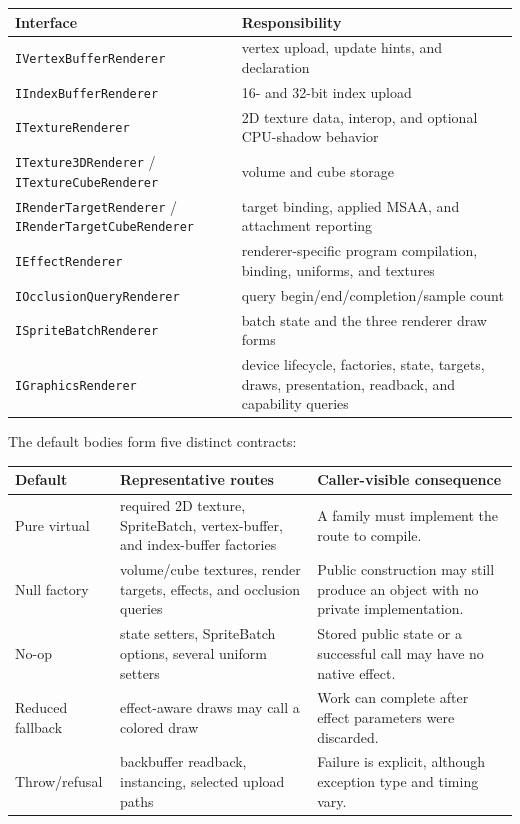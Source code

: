 \begin{center}
\small
\begin{tabular}{@{}p{}p{}@{}}
\toprule
\textbf{Interface} & \textbf{Responsibility} \\
\midrule
\texttt{IVertexBufferRenderer} & vertex upload, update hints, and declaration \\
\texttt{IIndexBufferRenderer} & 16- and 32-bit index upload \\
\texttt{ITextureRenderer} & 2D texture data, interop, and optional CPU-shadow behavior \\
\texttt{ITexture3DRenderer} / \texttt{ITextureCubeRenderer} & volume and cube storage \\
\texttt{IRenderTargetRenderer} / \texttt{IRenderTargetCubeRenderer} & target binding, applied MSAA, and attachment reporting \\
\texttt{IEffectRenderer} & renderer-specific program compilation, binding, uniforms, and textures \\
\texttt{IOcclusionQueryRenderer} & query begin/end/completion/sample count \\
\texttt{ISpriteBatchRenderer} & batch state and the three renderer draw forms \\
\texttt{IGraphicsRenderer} & device lifecycle, factories, state, targets, draws, presentation, readback, and capability queries \\
\bottomrule
\end{tabular}
\end{center}

The default bodies form five distinct contracts:

\begin{center}
\small
\begin{tabular}{@{}p{}p{}p{}@{}}
\toprule
\textbf{Default} & \textbf{Representative routes} & \textbf{Caller-visible consequence} \\
\midrule
Pure virtual & required 2D texture, SpriteBatch, vertex-buffer, and index-buffer factories & A family must implement the route to compile. \\
Null factory & volume/cube textures, render targets, effects, and occlusion queries & Public construction may still produce an object with no private implementation. \\
No-op & state setters, SpriteBatch options, several uniform setters & Stored public state or a successful call may have no native effect. \\
Reduced fallback & effect-aware draws may call a colored draw & Work can complete after effect parameters were discarded. \\
Throw/refusal & backbuffer readback, instancing, selected upload paths & Failure is explicit, although exception type and timing vary. \\
\bottomrule
\end{tabular}
\end{center}

